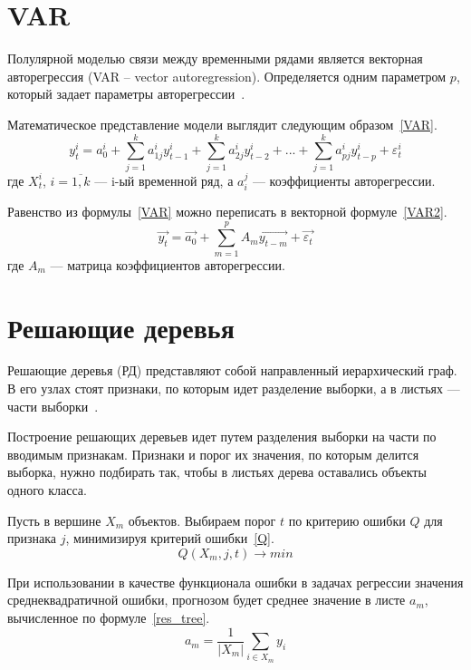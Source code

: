 \documentclass[a4paper, 14pt]{extreport}
\renewcommand{\vec}[1]{\overrightarrow{#1}}
\begin{document}
\section{VAR}

Полулярной моделью связи между временными рядами является векторная авторегрессия (VAR – vector autoregression). 
Определяется одним параметром $p$, который задает параметры авторегрессии~\cite{nosko}.

Математическое представление модели выглядит следующим образом~\ref{VAR}.
\begin{equation}
	\label{VAR}
	y_t^i = a_0^i +\sum \limits _{j=1}^{k} a_{1j}^iy_{t-1}^i + \sum \limits _{j=1}^{k} a_{2j}^iy_{t-2}^i + ... + \sum \limits _{j=1}^{k} 
	a_{pj}^iy_{t-p}^i + \varepsilon_t^i
\end{equation}
где $X_t^i$, $i=\overline{1,k}$ --- i-ый временной ряд, а $a_i^j$ --- коэффициенты авторегрессии.

Равенство из формулы~\ref{VAR} можно переписать в векторной формуле~\ref{VAR2}.
\begin{equation}
	\label{VAR2}
	\vec{y_t} = \vec{a_0} + \sum \limits_{m=1}^{p} A_m\vec{y_{t-m}} + \vec{\varepsilon_t}
\end{equation}
где $A_m$ --- матрица коэффициентов авторегрессии.

\section{Решающие деревья}

Решающие деревья (РД) представляют собой направленный иерархический граф. В его узлах стоят признаки, по которым идет 
разделение выборки, а в листьях --- части выборки~\cite{limanovskaya}.

Построение решающих деревьев идет путем разделения выборки на части по вводимым признакам. Признаки и порог их
значения, по которым делится выборка, нужно подбирать так, чтобы в листьях дерева оставались объекты одного класса.

Пусть в вершине $X_m$ объектов. Выбираем порог $t$ по критерию ошибки $Q$ для признака $j$, минимизируя критерий 
ошибки~\ref{Q}.
\begin{equation}
	\label{Q}
	Q(X_m,j,t) \rightarrow min
\end{equation}

При использовании в качестве функционала ошибки в задачах регрессии значения среднеквадратичной ошибки, прогнозом 
будет среднее значение в листе $a_m$, вычисленное по формуле~\ref{res_tree}.
\begin{equation}
	\label{res_tree}
	a_m = \frac{1}{|X_m|} \sum \limits_{i \in X_m} y_i
\end{equation}
\end{document}
